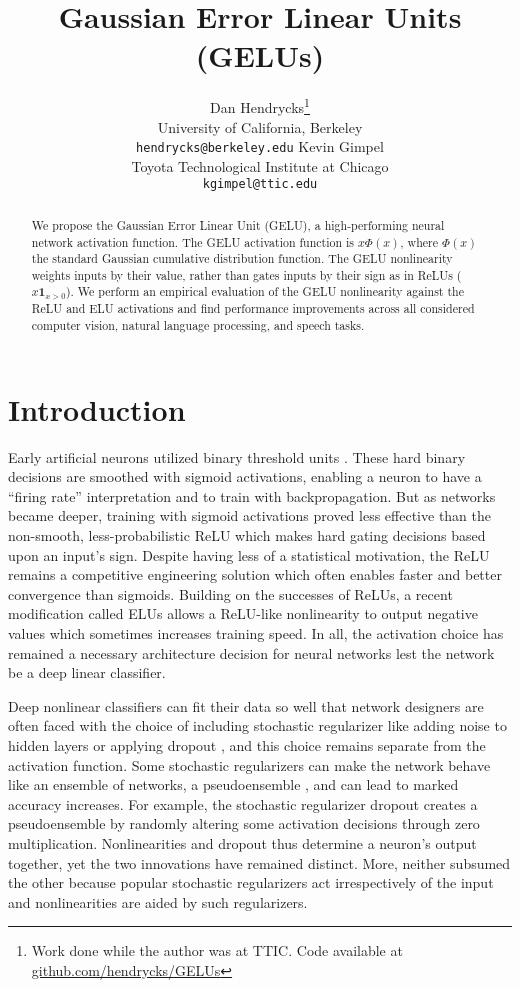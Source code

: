 \documentclass{article}
\title{Gaussian Error Linear Units (GELUs)}
\author{Dan Hendrycks\thanks{Work done while the author was at TTIC. Code available at \href{https://github.com/hendrycks/GELUs}{github.com/hendrycks/GELUs} }\\University of California, Berkeley\\\texttt{hendrycks@berkeley.edu} \And Kevin Gimpel\\ Toyota Technological Institute at Chicago\\\texttt{kgimpel@ttic.edu}}
\begin{document}
\maketitle

\begin{abstract}
We propose the Gaussian Error Linear Unit (GELU), a high-performing neural network activation function. The GELU activation function is $x\Phi(x)$, where $\Phi(x)$ the standard Gaussian cumulative distribution function. The GELU nonlinearity weights inputs by their value, rather than gates inputs by their sign as in ReLUs ($x\mathbf{1}_{x>0}$). We perform an empirical evaluation of the GELU nonlinearity against the ReLU and ELU activations and find performance improvements across all considered computer vision, natural language processing, and speech tasks.
\end{abstract}

\section{Introduction}
Early artificial neurons utilized binary threshold units \citep{hopfield, mcculloch}. These hard binary decisions are smoothed with sigmoid activations, enabling a neuron to have a ``firing rate'' interpretation and to train with backpropagation. But as networks became deeper, training with sigmoid activations proved less effective than the non-smooth, less-probabilistic ReLU \citep{relu} which makes hard gating decisions based upon an input's sign. Despite having less of a statistical motivation, the ReLU remains a competitive engineering solution which often enables faster and better convergence than sigmoids. Building on the successes of ReLUs, a recent modification called ELUs \citep{elu} allows a ReLU-like nonlinearity to output negative values which sometimes increases training speed. In all, the activation choice has remained a necessary architecture decision for neural networks lest the network be a deep linear classifier.

Deep nonlinear classifiers can fit their data so well that network designers are often faced with the choice of including stochastic regularizer like adding noise to hidden layers or applying dropout \citep{dropout}, and this choice remains separate from the activation function. Some stochastic regularizers can make the network behave like an ensemble of networks, a pseudoensemble \citep{bachman}, and can lead to marked accuracy increases. For example, the stochastic regularizer dropout creates a pseudoensemble by randomly altering some activation decisions through zero multiplication. Nonlinearities and dropout thus determine a neuron's output together, yet the two innovations have remained distinct. More, neither subsumed the other because popular stochastic regularizers act irrespectively of the input and nonlinearities are aided by such regularizers.
\end{document}
